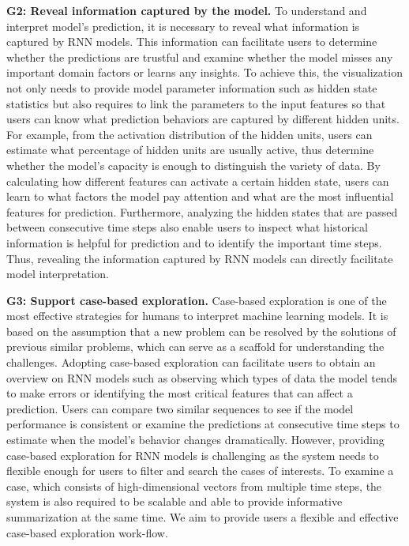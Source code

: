 \textbf{G2: Reveal information captured by the model.} 
To understand and interpret model's prediction, it is necessary to reveal what information is captured by RNN models.
This information can facilitate users to determine whether the predictions are trustful and examine whether the model misses any important domain factors or learns any insights.
To achieve this, the visualization not only needs to provide model parameter information such as hidden state statistics but also requires to link the parameters to the input features so that users can know what prediction behaviors are captured by different hidden units.
For example, from the activation distribution of the hidden units, users can estimate what percentage of hidden units are usually active, thus determine whether the model's capacity is enough to distinguish the variety of data.
By calculating how different features can activate a certain hidden state, users can learn to what factors the model pay attention and what are the most influential features for prediction.
Furthermore, analyzing the hidden states that are passed between consecutive time steps also enable users to inspect what historical information is helpful for prediction and to identify the important time steps.
Thus, revealing the information captured by RNN models can directly facilitate model interpretation.

\textbf{G3: Support case-based exploration.} 
Case-based exploration is one of the most effective strategies for humans to interpret machine learning models.
It is based on the assumption that a new problem can be resolved by the solutions of previous similar problems, which can serve as a scaffold for understanding the challenges.
Adopting case-based exploration can facilitate users to obtain an overview on RNN models such as observing which types of data the model tends to make errors or identifying the most critical features that can affect a prediction. 
Users can compare two similar sequences to see if the model performance is consistent or examine the predictions at consecutive time steps to estimate when the model's behavior changes dramatically.
However, providing case-based exploration for RNN models is challenging as the system needs to flexible enough for users to filter and search the cases of interests.
To examine a case, which consists of high-dimensional vectors from multiple time steps, the system is also required to be scalable and able to provide informative summarization at the same time.
We aim to provide users a flexible and effective case-based exploration work-flow.

